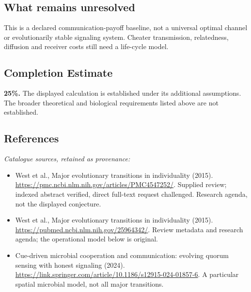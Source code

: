 \documentclass[11pt]{article}
\begin{document}
\subsection{What remains unresolved}
This is a declared communication-payoff baseline, not a universal optimal channel or evolutionarily stable signaling system. Cheater transmission, relatedness, diffusion and receiver costs still need a life-cycle model.
\subsection{Completion Estimate}
\textbf{25\%.} The displayed calculation is established under its additional assumptions. The broader theoretical and biological requirements listed above are not established.
\subsection{References}
\noindent\emph{Catalogue sources, retained as provenance:}
\begin{itemize}
\item West et al., Major evolutionary transitions in individuality (2015). \url{https://pmc.ncbi.nlm.nih.gov/articles/PMC4547252/}. Supplied review; indexed abstract verified, direct full-text request challenged. Research agenda, not the displayed conjecture.
\item West et al., Major evolutionary transitions in individuality (2015). \url{https://pubmed.ncbi.nlm.nih.gov/25964342/}. Review metadata and research agenda; the operational model below is original.
\item Cue-driven microbial cooperation and communication: evolving quorum sensing with honest signaling (2024). \url{https://link.springer.com/article/10.1186/s12915-024-01857-6}. A particular spatial microbial model, not all major transitions.
\end{itemize}
\clearpage


\appendix
\end{document}
